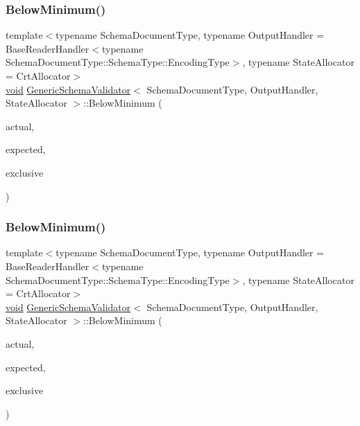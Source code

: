 \subsubsection{\texorpdfstring{Below\+Minimum()}{BelowMinimum()}\hspace{0.1cm}{\footnotesize\ttfamily [1/3]}}
{\footnotesize\ttfamily template$<$typename Schema\+Document\+Type, typename Output\+Handler = Base\+Reader\+Handler$<$typename Schema\+Document\+Type\+::\+Schema\+Type\+::\+Encoding\+Type$>$, typename State\+Allocator = Crt\+Allocator$>$ \\
\hyperlink{imgui__impl__opengl3__loader_8h_ac668e7cffd9e2e9cfee428b9b2f34fa7}{void} \hyperlink{classGenericSchemaValidator}{Generic\+Schema\+Validator}$<$ Schema\+Document\+Type, Output\+Handler, State\+Allocator $>$\+::Below\+Minimum (\begin{DoxyParamCaption}\item[{\hyperlink{stdint_8h_a414156feea104f8f75b4ed9e3121b2f6}{int64\+\_\+t}}]{actual,  }\item[{const \hyperlink{classGenericSchemaValidator_a3c004e35c7eb9fa5a28c0ccfb8ac62dc}{S\+Value} \&}]{expected,  }\item[{bool}]{exclusive }\end{DoxyParamCaption})\hspace{0.3cm}{\ttfamily [inline]}}

\mbox{\label{classGenericSchemaValidator_ad3db1f3852a1b2e6fada43fbcad401ea}} 
\subsubsection{\texorpdfstring{Below\+Minimum()}{BelowMinimum()}\hspace{0.1cm}{\footnotesize\ttfamily [2/3]}}
{\footnotesize\ttfamily template$<$typename Schema\+Document\+Type, typename Output\+Handler = Base\+Reader\+Handler$<$typename Schema\+Document\+Type\+::\+Schema\+Type\+::\+Encoding\+Type$>$, typename State\+Allocator = Crt\+Allocator$>$ \\
\hyperlink{imgui__impl__opengl3__loader_8h_ac668e7cffd9e2e9cfee428b9b2f34fa7}{void} \hyperlink{classGenericSchemaValidator}{Generic\+Schema\+Validator}$<$ Schema\+Document\+Type, Output\+Handler, State\+Allocator $>$\+::Below\+Minimum (\begin{DoxyParamCaption}\item[{\hyperlink{stdint_8h_aec6fcb673ff035718c238c8c9d544c47}{uint64\+\_\+t}}]{actual,  }\item[{const \hyperlink{classGenericSchemaValidator_a3c004e35c7eb9fa5a28c0ccfb8ac62dc}{S\+Value} \&}]{expected,  }\item[{bool}]{exclusive }\end{DoxyParamCaption})\hspace{0.3cm}{\ttfamily [inline]}}

